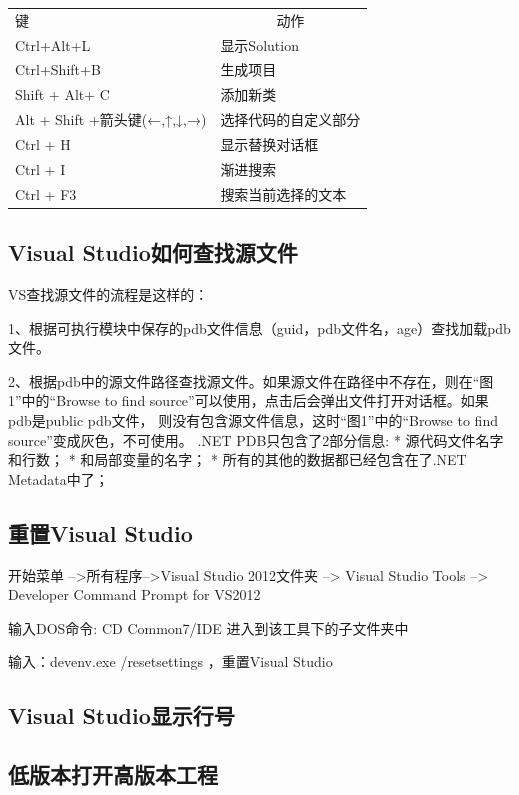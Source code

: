 \documentclass{book}
\begin{document}
\begin{tabular}{ll}
	\multirow{1}{*}{键}			
	& \multicolumn{1}{c}{动作}\\
	Ctrl+Alt+L & 显示Solution\\
	Ctrl+Shift+B & 生成项目 \\ 
	Shift + Alt+ C & 添加新类\\
	Alt + Shift +箭头键(←,↑,↓,→) & 选择代码的自定义部分\\
	Ctrl + H & 显示替换对话框\\
	Ctrl + I & 渐进搜索\\
	Ctrl + F3 & 搜索当前选择的文本\\	
\end{tabular}

\subsection{Visual Studio如何查找源文件}

VS查找源文件的流程是这样的： 

1、根据可执行模块中保存的pdb文件信息（guid，pdb文件名，age）查找加载pdb文件。

2、根据pdb中的源文件路径查找源文件。如果源文件在路径中不存在，则在“图1”中的“Browse to find source”可以使用，点击后会弹出文件打开对话框。如果pdb是public pdb文件，
则没有包含源文件信息，这时“图1”中的“Browse to find source”变成灰色，不可使用。
.NET PDB只包含了2部分信息:
 * 源代码文件名字和行数；
 * 和局部变量的名字；
 * 所有的其他的数据都已经包含在了.NET Metadata中了；

\subsection{重置Visual Studio}

开始菜单 -->所有程序-->Visual Studio 2012文件夹 --> Visual Studio Tools --> Developer Command Prompt for VS2012

输入DOS命令: CD Common7/IDE 进入到该工具下的子文件夹中

输入：devenv.exe /resetsettings ，重置Visual Studio

\subsection{Visual Studio显示行号}

\subsection{低版本打开高版本工程}
\end{document}
